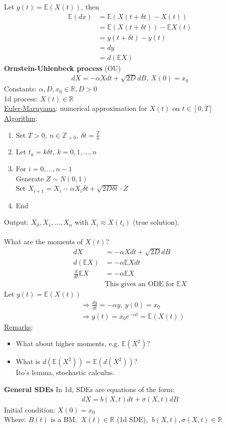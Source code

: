 \documentclass[12pt, letterpaper]{article}
\begin{document}
Let $y(t) = \mathbb{E}(X(t))$, then
\begin{align*}
    \mathbb{E}(dx) &= \mathbb{E}(X(t+\delta t) - X(t)) \\
    &= \mathbb{E}(X(t+\delta t)) - \mathbb{E}X(t) \\
    &= y(t +\delta t) - y(t) \\
    &= dy \\
    &= d(\mathbb{E}X)
\end{align*}
\textbf{Ornstein-Uhlenbeck process} (OU)
\begin{align*}
    dX = -\alpha Xdt + \sqrt{2D} dB,\ X(0) = x_0
\end{align*}
Constants: $\alpha, D, x_0 \in \mathbb{R}, D > 0$ \\
1d process: $X(t) \in \mathbb{R}$ \\
\underline{Euler-Maruyama}: numerical approximation for $X(t)$ on $t \in [0,T]$ \\
\underline{Algorithm}:
\begin{enumerate}
    \item Set $T > 0,\ n \in \mathbb{Z}_{>0},\ \delta t = \frac Tn$ 
    \item Let $t_k = k\delta t,\ k=0,1,\dots,n$
    \item For $i = 0,\dots, n-1$ \\
    Generate $Z \sim N(0,1)$ \\
    Set $X_{i+1} = X_i - \alpha X_i \delta t + \sqrt{2D\delta t} \cdot Z$
    \item End
\end{enumerate}
Output: $X_0, X_1, \dots, X_n$ with $X_i \approx X(t_i)$ (true solution). \\ \\
What are the moments of $X(t)$?
\begin{align*}
    dX &= -\alpha Xdt + \sqrt{2D} dB \\
    d(\mathbb{E}X) &= -\alpha \mathbb{E}Xdt \\
    \frac{d}{dt} \mathbb{E}X &= -\alpha \mathbb{E}X \\
    &\text{This gives an ODE for } \mathbb{E}X
\end{align*}
Let $y(t) = \mathbb{E}(X(t))$
\begin{align*}
    &\Rightarrow \frac{dy}{dt} = -\alpha y,\ y(0) = x_0 \\
    &\Rightarrow y(t) = x_0e^{-\alpha t} = \mathbb{E}(X(t))
\end{align*}
\underline{Remarks}:
\begin{itemize}
    \item What about higher moments, e.g. $\mathbb{E}(X^2)$?
    \item What is $d(\mathbb{E}(X^2)) = \mathbb{E}(d(X^2))$? \\
    Ito's lemma, stochastic calculus.
\end{itemize}
\textbf{General SDEs}
In 1d, SDEs are equations of the form:
\begin{align*}
    dX = b(X,t)dt + \sigma(X,t)dB
\end{align*}
Initial condition: $X(0) = x_0$ \\
Where: $B(t)$ is a BM, $\ X(t) \in \mathbb{R}$ (1d SDE), $\ b(X,t), \sigma(X,t) \in \mathbb{R}$
\end{document}
